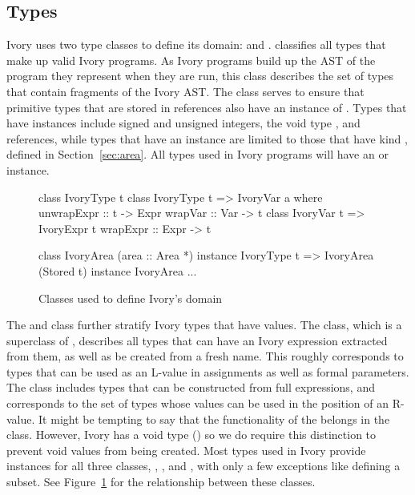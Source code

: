 \subsection{Types}
\label{sec:types}

Ivory uses two type classes to define its domain:  and
.   classifies all types that make up valid Ivory
programs.  As Ivory programs build up the AST of the program they represent when
they are run, this class describes the set of types that contain fragments of
the Ivory AST.  The  class serves to ensure that primitive types
that are stored in references also have an instance of .  Types
that have  instances include signed and unsigned integers, the
void type \cd{()}, and references, while types that have an 
instance are limited to those that have kind , defined in
Section~\ref{sec:area}.  All types used in Ivory programs will have an
 or  instance.

\begin{figure}[t]
\begin{code}
class IvoryType t
class IvoryType t => IvoryVar a where
  unwrapExpr :: t -> Expr
  wrapVar    :: Var -> t
class IvoryVar t => IvoryExpr t
  wrapExpr   :: Expr -> t

class    IvoryArea (area :: Area *)
instance IvoryType t => IvoryArea (Stored t)
instance IvoryArea ...
\end{code}
\caption{Classes used to define Ivory's domain}
\label{fig:types}
\end{figure}

The  and  class further stratify Ivory types that
have values.  The  class, which is a superclass of ,
describes all types that can have an Ivory expression extracted from them, as
well as be created from a fresh name.  This roughly corresponds to types that
can be used as an L-value in assignments as well as formal parameters.  The
 class includes types that can be constructed from full
expressions, and corresponds to the set of types whose values can be used in the
position of an R-value.  It might be tempting to say that the functionality of
the  belongs in the  class. However, Ivory has a void
type (\cd{()}) so we do require this distinction to prevent void values from
being created.  Most types used in Ivory provide instances for all three
classes, , , and , with only a few
exceptions like \cd{()} defining a subset.  See Figure~\ref{fig:types} for the
relationship between these classes.


